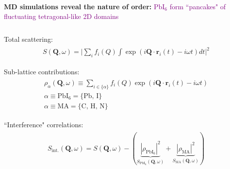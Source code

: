 \documentclass[12pt]{beamer}
\begin{document}
{\begin{frame}
\begin{columns}
\begin{column}{0.5\textwidth}
\textbf{MD simulations reveal the nature of order:} \textcolor{purple}{PbI$_6$ form ``pancakes" of fluctuating tetragonal-like 2D domains}

\end{column}
\end{columns}

\end{frame}

}


\begin{frame} %

Total scattering:
\begin{align*}
\begin{gathered}
    S(\bm{Q},\omega) = \Big| \sum_i f_i(Q) \int \exp(i\bm{Q}\cdot \bm{r}_i(t) -i \omega t ) dt \Big|^2
\end{gathered}    
\end{align*}

Sub-lattice contributions:
\begin{align*}
\begin{gathered}
    \rho_\alpha(\bm{Q},\omega) \equiv \sum_{i \in \{ \alpha \} } f_i(Q) \exp(i\bm{Q}\cdot \bm{r}_i(t) - i\omega t) \\
    \alpha \equiv \textrm{PbI}_6 = \{ \textrm{Pb,~I} \} \\
    \alpha \equiv \textrm{MA} = \{ \textrm{C,~H,~N} \} 
\end{gathered}    
\end{align*}

``Interference" correlations:
\begin{align*}
\begin{gathered}
    S_\text{int.}(\bm{Q},\omega) = S(\bm{Q},\omega)-(\underbrace{|\rho_{\text{PbI}_6}|^2}_{S_{\text{PbI}_6}(\bm{Q},\omega)}+\underbrace{|\rho_\text{MA}|^2}_{S_\text{MA}(\bm{Q},\omega)})
\end{gathered}    
\end{align*}

\end{frame}

\end{document}
